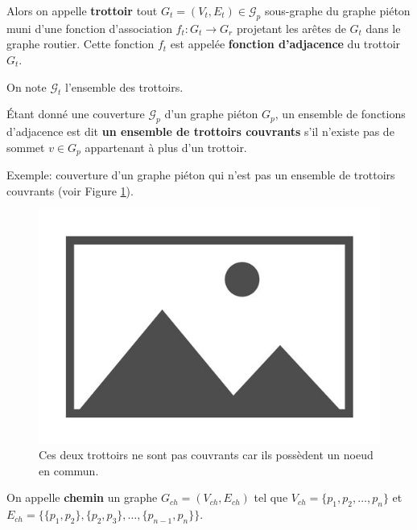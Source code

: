 \begin{definition}
    Alors on appelle \textbf{trottoir} tout $G_t = (V_t, E_t)\in \mathcal{G}_p$ sous-graphe du graphe piéton muni d'une fonction d'association $f_t: G_t \rightarrow G_r$ projetant les arêtes de $G_t$ dans le graphe routier. Cette fonction $f_t$ est appelée \textbf{fonction d'adjacence} du trottoir $G_t$.

    On note $\mathcal{G}_t$ l'ensemble des trottoirs.
\end{definition}

\begin{definition}
    Étant donné une couverture $\mathcal{G}_p$ d'un graphe piéton $G_p$, un ensemble de fonctions d'adjacence est dit \textbf{un ensemble de trottoirs couvrants} s'il n'existe pas de sommet $v \in G_p$ appartenant à plus d'un trottoir.
\end{definition}

\noindent
Exemple: couverture d'un graphe piéton qui n'est pas un ensemble de trottoirs couvrants (voir Figure \ref{fig:mod_ex_trottoirs_couvrants}).

\begin{figure}
    \centering
    \includegraphics{images/placeholder.jpg}
    \caption{Ces deux trottoirs ne sont pas couvrants car ils possèdent un noeud en commun.}
    \label{fig:mod_ex_trottoirs_couvrants}
\end{figure}

\begin{definition}
    On appelle \textbf{chemin} un graphe $G_{ch} = (V_{ch}, E_{ch})$ tel que $V_{ch}=\{p_1,p_2,\dots,p_n\}$ et $E_{ch}=\{\{p_1,p_2\},\{p_2,p_3\},\dots,\{p_{n-1},p_n\}\}$.
\end{definition}

